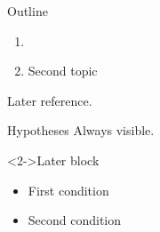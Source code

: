 \documentclass{beamer}
\begin{document}
\begin{frame}{Outline}
\begin{enumerate}
\item {}
\item Second topic
\end{enumerate}
\pause
Later reference.
\end{frame}

\begin{frame}{Hypotheses}
Always visible.
\begin{block}<2->{Later block}
\begin{itemize}
\item First condition
\item Second condition
\end{itemize}
\end{block}
\end{frame}
\end{document}
